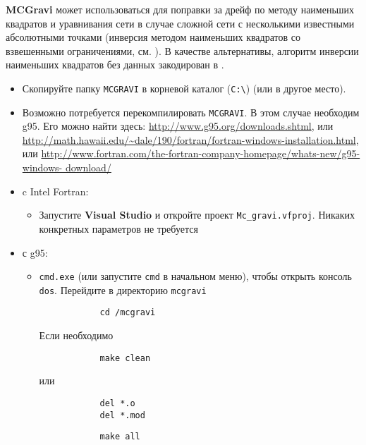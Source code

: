 \textbf{\textsf{MCGravi}} \cite{beilin_2006} может использоваться для поправки
за дрейф по методу наименьших квадратов и уравнивания сети в случае сложной сети
с несколькими известными абсолютными точками (инверсия методом наименьших
квадратов со взвешенными ограничениями, см. \cite{hwang_adjustment_2002}). В
качестве альтернативы, алгоритм инверсии наименьших квадратов без данных
\cite{hwang_adjustment_2002} закодирован в \pg{}.

\begin{itemize}
    \item Скопируйте папку \verb|MCGRAVI| в корневой каталог (\verb|C:\|) (или в другое место).

    \item Возможно потребуется перекомпилировать \verb|MCGRAVI|. В этом случае
    необходим g95. Его можно найти здесь:
    \url{http://www.g95.org/downloads.shtml}, или
    \url{http://math.hawaii.edu/~dale/190/fortran/fortran-windows-installation.html}, или
    \url{http://www.fortran.com/the-fortran-company-homepage/whats-new/g95-windows-
    download/}

    \item c Intel Fortran:
    \begin{itemize}
        \item Запустите \textbf{\textsf{Visual Studio}} и откройте проект \verb|Mc_gravi.vfproj|.
        Никаких конкретных параметров не требуется
        
    \end{itemize}

    \item с g95:
    \begin{itemize}
        \item \verb|cmd.exe| (или запустите \verb|cmd| в начальном меню), чтобы открыть
        консоль \verb|dos|. Перейдите в директорию \verb|mcgravi|
        \begin{lstlisting}
            cd /mcgravi 
        \end{lstlisting}
        
        Если необходимо
        \begin{lstlisting}
            make clean
        \end{lstlisting}
        или
        \begin{lstlisting}
            del *.o
            del *.mod
        \end{lstlisting}

        \begin{lstlisting}
            make all
        \end{lstlisting}


\end{itemize}
\end{itemize}
